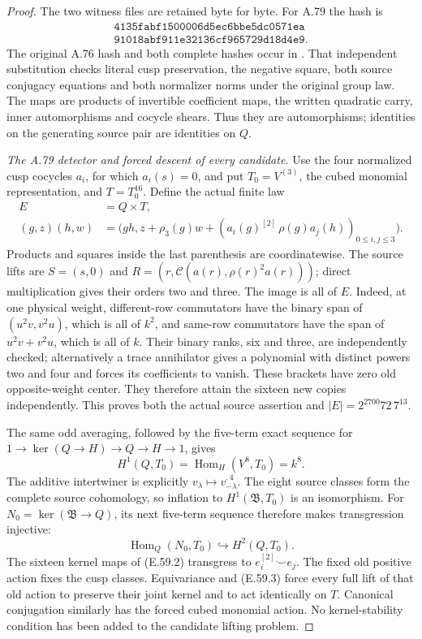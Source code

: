 \begin{proof}
The two witness files are retained byte for byte. For A.79 the hash is
\[
\begin{gathered}\texttt{4135fabf1500006d5ec6bbe5dc0571ea}\\[-2pt]
\texttt{91018abf911e32136cf965729d18d4e9}.
\end{gathered}
\]
The original A.76 hash and both complete hashes occur in
.
That independent substitution checks literal cusp preservation,
the negative square, both source conjugacy equations and both
normalizer norms under the original group law. The maps are products
of invertible coefficient maps, the written quadratic carry, inner
automorphisms and cocycle shears. Thus they are automorphisms;
identities on the generating source pair are identities on \(Q\).

\emph{The A.79 detector and forced descent of every candidate.}
Use the four normalized cusp cocycles \(a_i\), for which
\(a_i(s)=0\), and put \(T_0=V^{(3)}\), the cubed monomial
representation, and \(T=T_0^{16}\). Define the actual finite law
\[
\begin{aligned}
 E&=Q\times T,\\
 (g,z)(h,w)&=
 \bigl(gh,z+\rho_3(g)w+
       (a_i(g)^{[2]}\,\rho(g)a_j(h))_{0\le i,j\le3}\bigr).
\end{aligned}
                                                        \tag{E.59.2}
\]
Products and squares inside the last parenthesis are coordinatewise.
The source lifts are \(S=(s,0)\) and
\(R=(r,\mathcal C(a(r),\rho(r)^2a(r)))\); direct multiplication
gives their orders two and three. The image is all of \(E\).
Indeed, at one physical weight, different-row commutators have the
binary span of \((u^2v,v^2u)\), which is all of \(k^2\), and
same-row commutators have the span of \(u^2v+v^2u\), which is
all of \(k\). Their binary ranks, six and three, are independently
checked; alternatively a trace annihilator gives a polynomial with
distinct powers two and four and forces its coefficients to vanish.
These brackets have zero old opposite-weight center. They therefore
attain the sixteen new copies independently. This proves both the
actual source assertion and \(|E|=2^{2700}72\,7^{13}\).

The same odd averaging, followed by the five-term exact sequence for
\(1\to\ker(Q\to H)\to Q\to H\to1\), gives
\[
 H^1(Q,T_0)=\operatorname{Hom}_H(V^8,T_0)=k^8.
\]
The additive intertwiner is explicitly
\(v_\lambda\mapsto v_{-\lambda}^{,4}\).
The eight source classes form the complete source cohomology, so
inflation to \(H^1(\mathfrak B,T_0)\) is an isomorphism.
For \(N_0=\ker(\mathfrak B\to Q)\), its next five-term
sequence therefore makes transgression injective:
\[
 \operatorname{Hom}_Q(N_0,T_0)\hookrightarrow H^2(Q,T_0).
                                                        \tag{E.59.3}
\]
The sixteen kernel maps of (E.59.2) transgress to
\(e_i^{[2]}\smile e_j\). The fixed old positive action fixes
the cusp classes. Equivariance and (E.59.3) force every full lift
of that old action to preserve their joint kernel and to act
identically on \(T\). Canonical conjugation similarly has the
forced cubed monomial action. No kernel-stability condition has
been added to the candidate lifting problem.


\end{proof}
